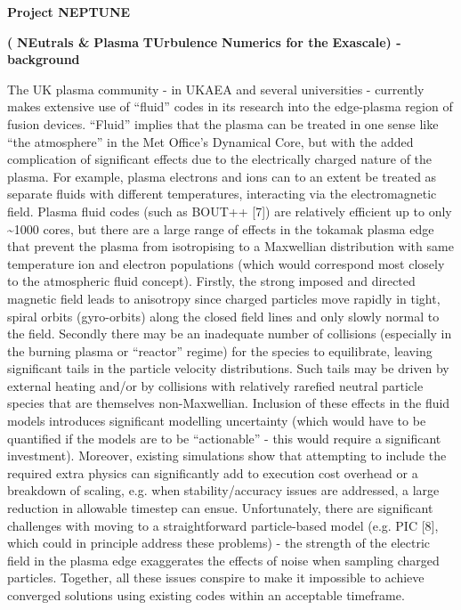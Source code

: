 \documentclass{article}
\begin{document}
\vspace{24pt}
{\huge{}{\color{color25} \textbf{Project NEPTUNE}}}

\vspace{12pt}
\textbf{(}{\color{color25} \textbf{NE}}\textbf{utrals \& }{\color{color25} \textbf{P}}\textbf{lasma 
}{\color{color25} \textbf{TU}}\textbf{rbulence }{\color{color25} \textbf{N}}\textbf{umerics 
for the }{\color{color25} \textbf{E}}\textbf{xascale) - background}

\vspace{24pt}
The UK plasma community - in UKAEA and several universities - currently makes extensive 
use of ``fluid'' codes in its research into the edge-plasma region of fusion devices. 
``Fluid'' implies that the plasma can be treated in one sense like ``the atmosphere'' 
in the Met Office's Dynamical Core, but with the added complication of significant 
effects due to the electrically charged nature of the plasma. For example, plasma 
electrons and ions can to an extent be treated as separate fluids with different 
temperatures, interacting via the electromagnetic field. Plasma fluid codes (such 
as {\color{color29} BOUT++ [7]) are relatively }efficient up to only \textasciitilde{}1000 
cores, but there are a large range of effects in the tokamak plasma edge that prevent 
the plasma from isotropising to a Maxwellian distribution with same temperature 
ion and electron populations (which would correspond most closely to the atmospheric 
fluid concept). Firstly, the strong imposed and directed magnetic field leads to 
anisotropy since charged particles move rapidly in tight, spiral orbits (gyro-orbits) 
along the closed field lines and only slowly normal to the field. Secondly there 
may be an inadequate number of collisions (especially in the burning plasma or 
``reactor'' regime) for the species to equilibrate, leaving significant tails in 
the particle velocity distributions. Such tails may be driven by external heating 
and/or by collisions with relatively rarefied neutral particle species that are 
themselves non-Maxwellian. Inclusion of these effects in the fluid models introduces 
significant modelling uncertainty (which would have to be quantified if the models 
are to be ``actionable'' - this would require a significant investment). Moreover, 
existing simulations show that attempting to include the required extra physics 
can significantly add to execution cost overhead or a breakdown of scaling, e.g. 
when stability/accuracy issues are addressed, a large reduction in allowable timestep 
can ensue. Unfortunately, there are significant challenges with moving to a straightforward 
particle-based {\color{color29} model (e.g. PIC [8], which }could in principle 
address these problems) - the strength of the electric field in the plasma edge 
exaggerates the effects of noise when sampling charged particles. Together, all 
these issues conspire to make it impossible to achieve converged solutions using 
existing codes within an acceptable timeframe.
\end{document}
